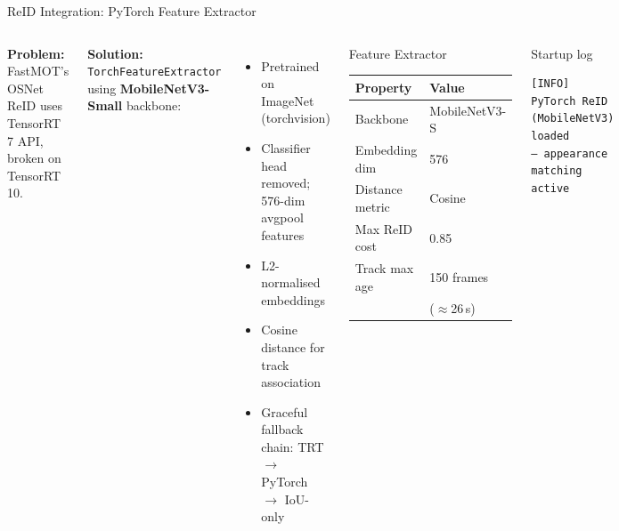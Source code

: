 \documentclass[aspectratio=169]{beamer}
\begin{document}
\begin{frame}[fragile]{ReID Integration: PyTorch Feature Extractor}
\begin{columns}[T]
\textbf{Problem:} FastMOT's OSNet ReID uses TensorRT 7 API,
broken on TensorRT 10.

\vspace{0.2cm}
\textbf{Solution:} \texttt{TorchFeatureExtractor} using
\textbf{MobileNetV3-Small} backbone:
\begin{itemize}
  \item Pretrained on ImageNet (torchvision)
  \item Classifier head removed; 576-dim avgpool features
  \item L2-normalised embeddings
  \item Cosine distance for track association
  \item Graceful fallback chain:
        TRT $\rightarrow$ PyTorch $\rightarrow$ IoU-only
\end{itemize}

\begin{block}{Feature Extractor}
\small
\begin{tabular}{ll}
\toprule
Property        & Value \\
\midrule
Backbone        & MobileNetV3-S \\
Embedding dim   & 576 \\
Distance metric & Cosine \\
Max ReID cost   & 0.85 \\
Track max age   & 150 frames \\
                & ($\approx$26\,s) \\
\bottomrule
\end{tabular}
\end{block}

\begin{block}{Startup log}
\begin{lstlisting}[language={}]
[INFO] PyTorch ReID
(MobileNetV3) loaded
— appearance matching
active
\end{lstlisting}
\end{block}

\end{columns}
\end{frame}
\end{document}
